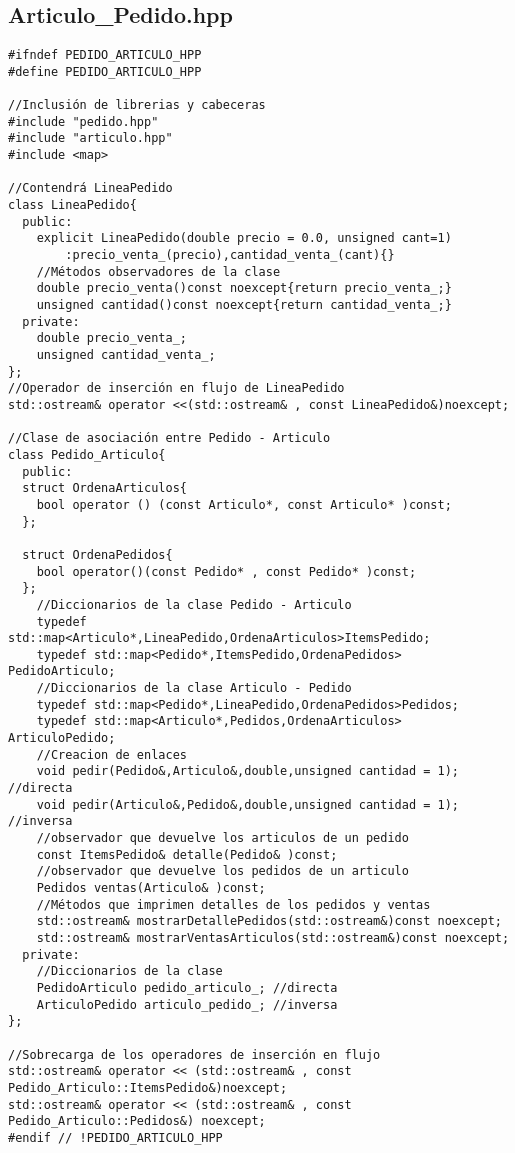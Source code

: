 \subsection{Articulo\_Pedido.hpp}
\begin{verbatim}
#ifndef PEDIDO_ARTICULO_HPP
#define PEDIDO_ARTICULO_HPP

//Inclusión de librerias y cabeceras
#include "pedido.hpp"
#include "articulo.hpp"
#include <map>

//Contendrá LineaPedido
class LineaPedido{
  public:
    explicit LineaPedido(double precio = 0.0, unsigned cant=1)
        :precio_venta_(precio),cantidad_venta_(cant){}
    //Métodos observadores de la clase
    double precio_venta()const noexcept{return precio_venta_;}
    unsigned cantidad()const noexcept{return cantidad_venta_;}
  private:
    double precio_venta_;
    unsigned cantidad_venta_;
};
//Operador de inserción en flujo de LineaPedido
std::ostream& operator <<(std::ostream& , const LineaPedido&)noexcept;

//Clase de asociación entre Pedido - Articulo
class Pedido_Articulo{
  public:
  struct OrdenaArticulos{
    bool operator () (const Articulo*, const Articulo* )const;
  };

  struct OrdenaPedidos{
    bool operator()(const Pedido* , const Pedido* )const;
  };
    //Diccionarios de la clase Pedido - Articulo
    typedef std::map<Articulo*,LineaPedido,OrdenaArticulos>ItemsPedido;
    typedef std::map<Pedido*,ItemsPedido,OrdenaPedidos> PedidoArticulo;
    //Diccionarios de la clase Articulo - Pedido
    typedef std::map<Pedido*,LineaPedido,OrdenaPedidos>Pedidos;
    typedef std::map<Articulo*,Pedidos,OrdenaArticulos> ArticuloPedido;
    //Creacion de enlaces
    void pedir(Pedido&,Articulo&,double,unsigned cantidad = 1); //directa
    void pedir(Articulo&,Pedido&,double,unsigned cantidad = 1); //inversa
    //observador que devuelve los articulos de un pedido
    const ItemsPedido& detalle(Pedido& )const;
    //observador que devuelve los pedidos de un articulo
    Pedidos ventas(Articulo& )const;
    //Métodos que imprimen detalles de los pedidos y ventas
    std::ostream& mostrarDetallePedidos(std::ostream&)const noexcept;
    std::ostream& mostrarVentasArticulos(std::ostream&)const noexcept;
  private:
    //Diccionarios de la clase
    PedidoArticulo pedido_articulo_; //directa
    ArticuloPedido articulo_pedido_; //inversa
};

//Sobrecarga de los operadores de inserción en flujo
std::ostream& operator << (std::ostream& , const Pedido_Articulo::ItemsPedido&)noexcept;
std::ostream& operator << (std::ostream& , const Pedido_Articulo::Pedidos&) noexcept;
#endif // !PEDIDO_ARTICULO_HPP

\end{verbatim}

